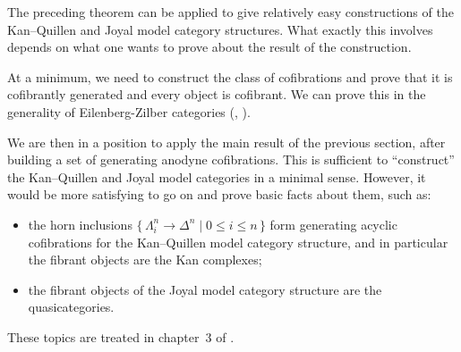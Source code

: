 \documentclass{article}
\theoremstyle{definition}
\theoremstyle{plain}
\newcommand{\KQ}{Kan--Quillen}
\begin{document}
The preceding theorem can be applied to give relatively easy constructions of the \KQ{} and Joyal model category structures.
What exactly this involves depends on what one wants to prove about the result of the construction.

At a minimum, we need to construct the class of cofibrations and prove that it is cofibrantly generated and every object is cofibrant.
We can prove this in the generality of Eilenberg-Zilber categories (\cite{C19}, \cite{BR}).

We are then in a position to apply the main result of the previous section, after building a set of generating anodyne cofibrations.
This is sufficient to ``construct'' the \KQ{} and Joyal model categories in a minimal sense.
However, it would be more satisfying to go on and prove basic facts about them, such as:
\begin{itemize}
\item the horn inclusions $\{\,\Lambda^n_i \to \Delta^n \mid 0 \le i \le n\,\}$ form generating acyclic cofibrations for the \KQ{} model category structure, and in particular the fibrant objects are the Kan complexes;
\item the fibrant objects of the Joyal model category structure are the quasicategories.
\end{itemize}
These topics are treated in chapter~3 of \cite{C19}.

\printbibliography
\end{document}
